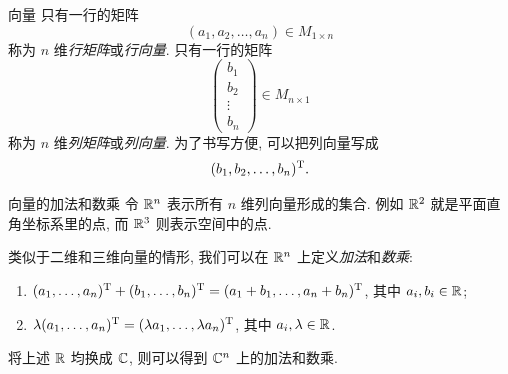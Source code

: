 \begin{frame}{向量}
	\onslide<+->
	只有一行的矩阵
	\[(a_1,a_2,\dots,a_n)\in M_{1\times n}\]
	称为 $n$ 维\emph{行矩阵}或\emph{行向量}.
	\onslide<+->
	只有一行的矩阵
	\[\begin{pmatrix}
		b_1\\b_2\\\vdots\\b_n
	\end{pmatrix}\in M_{n\times 1}\]
	称为 $n$ 维\emph{列矩阵}或\emph{列向量}.
	\onslide<+->
	为了书写方便, 可以把列向量写成
	\[(b_1,b_2,\dots,b_n)^{\mathrm{T}}.\]
\end{frame}


\begin{frame}{向量的加法和数乘}
	\onslide<+->
	令 ${\mathbb{R}}^n$ 表示所有 $n$ 维列向量形成的集合.
	\onslide<+->
	例如 ${\mathbb{R}}^2$ 就是平面直角坐标系里的点, 而 ${\mathbb{R}}^3$ 则表示空间中的点.

	\onslide<+->
	类似于二维和三维向量的情形, 我们可以在 ${\mathbb{R}}^n$ 上定义\emph{加法}和\emph{数乘}:
	\begin{enumerate}
		\item $(a_1,\dots,a_n)^{\mathrm{T}}+(b_1,\dots,b_n)^{\mathrm{T}}=(a_1+b_1,\dots,a_n+b_n)^{\mathrm{T}}$, 其中 $a_i,b_i\in{\mathbb{R}}$;
		\item $\lambda(a_1,\dots,a_n)^{\mathrm{T}}=(\lambda a_1,\dots,\lambda a_n)^{\mathrm{T}}$, 其中 $a_i,\lambda\in{\mathbb{R}}$.
	\end{enumerate}

	\onslide<+->
	将上述 ${\mathbb{R}}$ 均换成 ${\mathbb{C}}$, 则可以得到 ${\mathbb{C}}^n$ 上的加法和数乘.
\end{frame}


